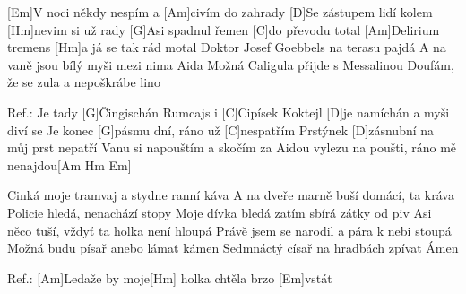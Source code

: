 
[Em]V noci někdy nespím a [Am]civím do zahrady
[D]Se zástupem lidí kolem [Hm]nevim si už rady
[G]Asi spadnul řemen [C]do převodu total
[Am]Delirium tremens [Hm]a já se tak rád motal
Doktor Josef Goebbels na terasu pajdá
A na vaně jsou bílý myši mezi nima Aida
Možná Caligula přijde s Messalinou
Doufám, že se zula a nepoškrábe lino

Ref.: Je tady [G]\null Čingischán Rumcajs i [C]Cipísek
Koktejl [D]je namíchán a myši diví se
Je konec [G]pásmu dní, ráno už [C]nespatřím
Prstýnek [D]zásnubní na můj prst nepatří
Vanu si napouštím a skočím za Aidou
vylezu na poušti,
ráno mě nenajdou[Am Hm Em]

Cinká moje tramvaj a stydne ranní káva
A na dveře marně buší domácí, ta kráva
Policie hledá, nenachází stopy
Moje dívka bledá zatím sbírá zátky od piv
Asi něco tuší, vždyť ta holka není hloupá
Právě jsem se narodil a pára k nebi stoupá
Možná budu písař anebo lámat kámen
Sedmnáctý císař na hradbách zpívat Ámen

Ref.: 
[Am]Ledaže by moje[Hm] holka chtěla brzo [Em]vstát
